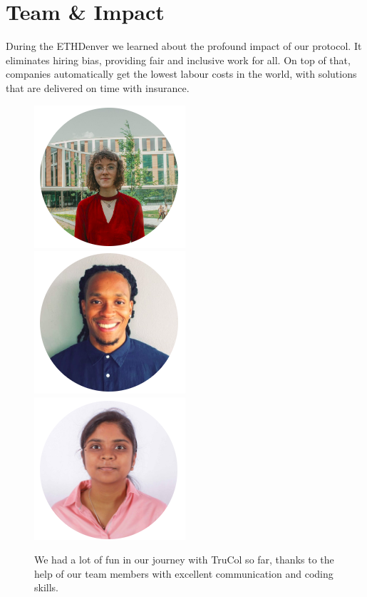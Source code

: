 \vspace{-0.16cm}
\section{Team \& Impact}
\vspace{-0.15cm}
During the ETHDenver we learned about the profound impact of our protocol. It eliminates hiring bias, providing fair and inclusive work for all. On top of that, companies automatically get the lowest labour costs in the world, with solutions that are delivered on time with insurance.
\begin{figure}[htp]

    \centering
    \includegraphics[width=.15\textwidth]{latex/Images/Clara.png}\hfill
    \includegraphics[width=.15\textwidth]{latex/Images/Rashim.png}\hfill
    \includegraphics[width=.15\textwidth]{latex/Images/Subhechha.png}

    \caption*{We had a lot of fun in our journey with TruCol so far, thanks to the help of our team members with excellent communication and coding skills.}

\end{figure}
